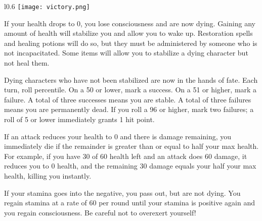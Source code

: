 \begin{wrapfigure}{l}{0.6\textwidth}
	\texttt{[image: victory.png]}
\end{wrapfigure}

If your health drops to 0, you lose consciousness and are now dying. Gaining any amount of health will stabilize you and allow you to wake up. Restoration spells and healing potions will do so, but they must be administered by someone who is not incapacitated. Some items will allow you to stabilize a dying character but not heal them.

Dying characters who have not been stabilized are now in the hands of fate. Each turn, roll percentile. On a 50 or lower, mark a success. On a 51 or higher, mark a failure. A total of three successes means you are stable. A total of three failures means you are permanently dead. If you roll a 96 or higher, mark two failures; a roll of 5 or lower immediately grants 1 hit point.

If an attack reduces your health to 0 and there is damage remaining, you immediately die if the remainder is greater than or equal to half your max health. For example, if you have 30 of 60 health left and an attack does 60 damage, it reduces you to 0 health, and the remaining 30 damage equals your half your max health, killing you instantly.

If your stamina goes into the negative, you pass out, but are not dying. You regain stamina at a rate of 60 per round until your stamina is positive again and you regain consciousness. Be careful not to overexert yourself!
